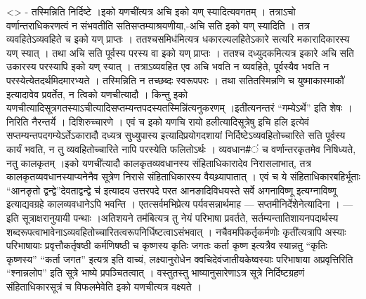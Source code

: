 \textless{}\textgreater{} - तस्मिन्निति निर्दिष्टे ।इको यणची॑त्यत्र अचि
इको यण् स्यादित्यवगतम् । तत्राऽचो वर्णान्तराधिकरणत्वं न संभवतीति
सतिसप्तम्याश्रयणीया,-अचि सति इको यण् स्यादिति । तत्र व्यवहितेऽव्यवहिते च
इको यण् प्राप्तः । ततश्चसमिध॑मित्यत्र धकारल्यलहितेऽकारे सत्यरि
मकारादिकारस्य यण् स्यात् । तथा अचि सति पूर्वस्य परस्य वा इको यण्
प्राप्तः । ततश्च दध्युदकमित्यत्र इकारे अचि सति उकारस्य परस्यापि इको यण्
स्यात् । तत्राऽव्यवहित एव अचि भवति न व्यवहिते, पूर्वस्यैव भवति न
परस्येत्येतदर्थमिदमारभ्यते । तस्मिन्निति न तच्छब्दः स्वरूपपरः । तथा
सतितस्मिन्नणि च युष्माकास्माकौ॑ इत्यादावेव प्रवर्तेत, न त्विको
यणचीत्यादौ । किन्तु इको
यणचीत्यादिसूत्रगतस्याऽचीत्यादिसप्तम्यन्तपदस्यतस्मिन्नि॑त्यनुकरणम्
।इती॑त्यनन्तरं ``गम्येऽर्थे'' इति शेषः । निरिति नैरन्तर्ये ।
दिशिरुच्चारणे । एवं च इको यणचि रायो हलीत्यादिसूत्रेषु इचि हलि इत्येवं
सप्तम्यन्तपदगम्येऽर्तेऽकारादौ दध्यत्र सुध्युपास्य इत्यादिप्रयोगदशायां
निर्दिष्टेऽव्यवहितोच्चारिते सति पूर्वस्य कार्यं भवति, न तु
व्यवहितोच्चारिते नापि परस्येति फलितोऽर्थः । व्यवधान\#ं च वर्णान्तरकृतमेव
निषिध्यते, नतु कालकृतम् ।इको यणची॑त्यादौ कालकृतव्यवधानस्य
संहिताधिकारादेव निरासलाभात्, तत्र कालकृतव्यवधानस्याप्यनेनैव सूत्रेण
निरासे संहिताधिकारस्य वैयथ्र्यापातात् । एवं च ये संहिताधिकारबहिर्भूताः
``आनङृतो द्वन्द्वे''देवताद्वन्द्वे च॑ इत्यादय उत्तरपदे परत
आनङादिविधयस्ते सर्वे अगनाविष्णू इत्यग्नाविष्णू इत्याद्यवग्रहे
कालव्यवधानेऽपि भवन्ति । एतत्सर्वमभिप्रेत्य पर्यवसन्नार्थमाह ---
सप्तमीनिर्देशेनेत्यादिना । --- इति सूत्राक्षरानुयायी पन्थाः ।अतिशयने
तम॑बित्यत्र तु नेयं परिभाषा प्रवर्तते, सर्तम्यन्तातिशायनपदार्थस्य
शब्दरूपत्वाभावेनाऽव्यवहितोच्चारितत्वरूपनिर्धिष्टत्वाऽसंभवात् ।
नचैवमपिकर्तृकर्मणोः कृती॑त्यत्रापि अस्याः परिभाषायाः प्रवृत्तौकर्तृषष्ठी
कर्मणिषष्ठी च कृष्णस्य कृतिः जगतः कर्ता कृष्ण इत्यत्रैव स्यान्नतु
``कृतिः कृष्णस्य'' ``कर्ता जगत'' इत्यत्र इति वाच्यं, लक्ष्यानुरोधेन
क्वचिदेवंजातीयकेष्वस्याः परिभाषाया अप्रवृत्तिरिति ``श्नान्नलोप'' इति
सूत्रे भाष्ये प्रपञ्चितत्वात् । वस्तुतस्तु भाष्यानुसारेणाऽत्र सूत्रे
निर्दिष्टग्रहणं संहिताधिकारसूत्रं च विफलमेवेति इको यणचीत्यत्र वक्ष्यते ।
